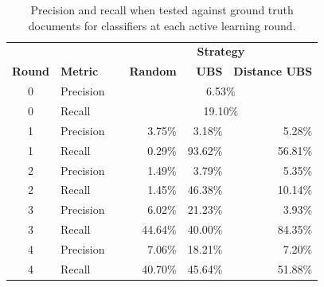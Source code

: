 \begin{table}[ht!]
\centering
\caption{Precision and recall when tested against ground truth documents for classifiers at each active learning round.\label{tab:pr_table}
}
\vspace{2ex}
\setlength\tabcolsep{6pt}
\begin{tabular}{|c| l | r | r | r |}
\hline
& & \multicolumn{3}{c|}{\textbf{Strategy}} \\
 \textbf{Round} & \textbf{Metric} & \textbf{Random} & \textbf{UBS}  & \textbf{Distance UBS}  \\
\hline
0 & Precision &        \multicolumn{3}{c|}{6.53\%} \\
0 & Recall\ \ \ \ \ &               \multicolumn{3}{c|}{19.10\%} \\
\hline
1 & Precision     & 3.75\%       &      3.18\%      &  5.28\% \\
1 & Recall\ \ \ \ \ & 0.29\%      &   93.62\%     &  56.81\% \\
\hline
2& Precision      & 1.49\%           &      3.79\%      &  5.35\% \\
2& Recall\ \ \ \ \ & 1.45\%           &    46.38\%      &  10.14\% \\
\hline
3 & Precision      & 6.02\%              &    21.23\%      &  3.93\% \\
3 & Recall\ \ \ \ \ & 44.64\%            &    40.00\%      &  84.35\%  \\
\hline
4& Precision     & 7.06\%          &    18.21\%      &  7.20\% \\
4& Recall\ \ \ \ \ & 40.70\%         &     45.64\%     &  51.88\% \\
\hline
\end{tabular}
\end{table}

